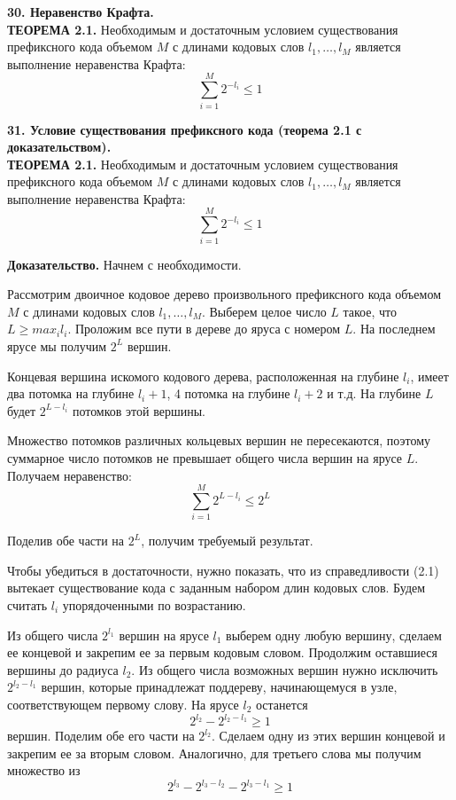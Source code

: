 \documentclass[14pt]{article}
\begin{document}
\bigskip
\textbf{30. Неравенство Крафта.} \\

\textbf{ТЕОРЕМА 2.1.} Необходимым и достаточным условием существования префиксного кода объемом \(M\) с длинами кодовых слов \(l_1,\ldots,l_M\) является выполнение неравенства Крафта:
\begin{displaymath}
    \sum_{i=1}^{M} 2^{-l_i} \leq 1
\end{displaymath}

\bigskip
\textbf{31. Условие существования префиксного кода (теорема 2.1 с доказательством).} \\

\textbf{ТЕОРЕМА 2.1.} Необходимым и достаточным условием существования префиксного кода объемом \(M\) с длинами кодовых слов \(l_1,\ldots,l_M\) является выполнение неравенства Крафта:
\begin{displaymath}
    \sum_{i=1}^{M} 2^{-l_i} \leq 1
\end{displaymath}

\textbf{Доказательство.} Начнем с необходимости.

Рассмотрим двоичное кодовое дерево произвольного префиксного кода объемом \(M\) с длинами кодовых слов \(l_1,\ldots,l_M\). Выберем целое число \(L\) такое, что \(L \geq max_i l_i\). Проложим все пути в дереве до яруса с номером \(L\). На последнем ярусе мы получим \(2^L\) вершин.

Концевая вершина искомого кодового дерева, расположенная на глубине \(l_i\), имеет два потомка на глубине \(l_i + 1\), 4 потомка на глубине \(l_i + 2\) и т.д. На глубине \(L\) будет \(2^{L-l_i}\) потомков этой вершины.

Множество потомков различных кольцевых вершин не пересекаются, поэтому суммарное число потомков не превышает общего числа вершин на ярусе \(L\). Получаем неравенство:
\begin{displaymath}
    \sum_{i=1}^{M} 2^{L-l_i} \leq 2^L
\end{displaymath}

Поделив обе части на \(2^L\), получим требуемый результат.

Чтобы убедиться в достаточности, нужно показать, что из справедливости (2.1) вытекает существование кода с заданным набором длин кодовых слов. Будем считать \(l_i\) упорядоченными по возрастанию.

Из общего числа \(2^{l_1}\) вершин на ярусе \(l_1\) выберем одну любую вершину, сделаем ее концевой и закрепим ее за первым кодовым словом. Продолжим оставшиеся вершины до радиуса \(l_2\). Из общего числа возможных вершин нужно исключить \(2^{l_2-l_1}\) вершин, которые принадлежат поддереву, начинающемуся в узле, соответствующем первому слову. На ярусе \(l_2\) останется
\begin{displaymath}
    2^{l_2} - 2^{l_2-l_1} \geq 1
\end{displaymath}
вершин. Поделим обе его части на \(2^{l_2}\). Сделаем одну из этих вершин концевой и закрепим ее за вторым словом. Аналогично, для третьего слова мы получим множество из
\begin{displaymath}
    2^{l_3} - 2^{l_3-l_2} - 2^{l_3-l_1} \geq 1
\end{displaymath}
\end{document}
